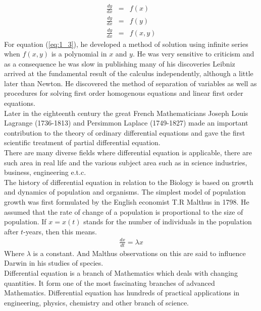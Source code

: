 \documentclass[11pt]{report}
\newcommand{\sps}{\\[0.2cm]}
\newcommand{\refn}[1]{(\ref{#1})}
\newcommand{\refx}[1]{\refn{eq:#1}}
\newcommand{\NI}{\noindent}
\begin{document}
	\begin{eqnarray}
		\frac{dy}{dx}&=&f(x)\label{eq:1_1}\sps
		\frac{dy}{dx}&=&f(y)\label{eq:1_2}\sps
		\frac{dy}{dx}&=&f(x,y)\label{eq:1_3}
	\end{eqnarray}
	For equation \refx{1_3}, he developed a method of solution using infinite series when $f(x, y)$ is a polynomial in $x$ and $y$. He was very sensitive to criticism and as a consequence he was slow in publishing many of his discoveries Leibniz arrived at the fundamental result of the calculus independently, although a little later than Newton. He discovered the method of separation of variables as well as procedures for solving first order homogenous equations and linear first order equations.\\
	
	\NI Later in the eighteenth century the great French Mathematicians Joseph Louis Lagrange (1736-1813) and Persimmon Laplace (1749-1827) made an important contribution to the theory of ordinary differential equations and gave the first scientific treatment of partial differential equation.\\
	
	\NI There are many diverse fields where differential equation is applicable, there are such area in real life and the various subject area such as in science industries, business, engineering  e.t.c.\\
	
	\NI The history of differential equation in relation to the Biology is based on growth and dynamics of population and organisms. The simplest model of population growth was first formulated by the English economist T.R Malthus in 1798. He assumed that the rate of change of a population is proportional to the size of population. If $x =x(t)$ stands for the number of individuals in the population after $t$-years, then this means.
	\begin{eqnarray}
		\frac{dx}{dt} = \lambda x \label{eq:1_4}
	\end{eqnarray}
	Where $\lambda$ is a constant. And Malthus observations on this are said to influence Darwin in his studies of species.\\
		
	\NI Differential equation is a branch of Mathematics which deals with changing quantities. It form one of the most fascinating branches of advanced Mathematics. Differential equation has hundreds of practical applications in engineering, physics, chemistry and other branch of science.\\
	
\end{document}
